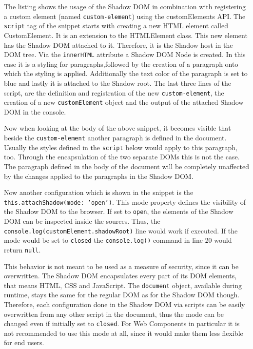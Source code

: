 The listing shows the usage of the Shadow DOM in combination with registering a custom element (named \texttt{custom-element}) using the customElements API.
The \texttt{script} tag of the snippet starts with creating a new HTML element called CustomElement. It is an extension to the HTMLElement class. This new element has the Shadow DOM attached to it. Therefore, it is the Shadow host in the DOM tree. Via the \texttt{innerHTML} attribute a Shadow DOM Node is created. In this case it is a styling for paragraphs,followed by the creation of a paragraph onto which the styling is applied. Additionally the text color of the paragraph is set to blue and lastly it is attached to the Shadow root.
The last three lines of the script, are the definition and registration of the new \texttt{custom-element}, the creation of a new \texttt{customElement} object and the output of the attached Shadow DOM in the console.

Now when looking at the body of the above snippet, it becomes visible that beside the \texttt{custom-element} another paragraph is defined in the document. Usually the styles defined in the \texttt{script} below would apply to this paragraph, too. Through the encapsulation of the two separate DOMs this is not the case. The paragraph defined in the body of the document will be completely unaffected by the changes applied to the paragraphs in the Shadow DOM.\cite{simon_thesis}

Now another configuration which is shown in the snippet is the \texttt{this.attachShadow({mode: 'open'})}. This mode property defines the visibility of the Shadow DOM to the browser. If set to \texttt{open}, the elements of the Shadow DOM can be inspected inside the sources. Thus, the \texttt{console.log(customElement.shadowRoot)} line would work if executed. 
If the mode would be set to \texttt{closed}  the \texttt{console.log()} command in line 20 would return \texttt{null}.\cite{simon_thesis}

This behavior is not meant to be used as a measure of security, since it can be overwritten. The Shadow DOM encapsulates every part of its DOM elements, that means HTML, CSS and JavaScript. The \texttt{document} object, available during runtime, stays the same for the regular DOM as for the Shadow DOM though. Therefore, each configuration done in the Shadow DOM via scripts can be easily overwritten from any other script in the document, thus the mode can be changed even if initially set to \texttt{closed}.\cite{shadow_dom_encapsulation} For Web Components in particular it is not recommended to use this mode at all, since it would make them less flexible for end users.\cite{wc_shadow_dom_google}

